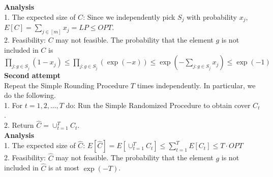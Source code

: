 \noindent\textbf{Analysis}\\
1. The expected size of $C$: Since we independently pick $S_j$ with probability $x_j$, $E[C]=\sum_{j \in [m]}x_j=LP\le OPT$.\\
2. Feasibility: $C$ may not feasible. The probability that the element $g$ is not included in $C$ is $\prod_{j:g\in S_j}(1-x_j)\le \prod_{j:g\in S_j}(\exp({-x})) \le \exp({-\sum_{j:g\in S_j}x_j}) \le \exp({-1})$\\
\noindent\textbf{Second attempt}\\
Repeat the Simple Rounding Procedure $T$ times independently. In particular, we do the following.\\
1. For $t=1,2,...,T$ do:
Run the Simple Randomized Procedure to obtain cover $C_t$.\\
2. Return $\widehat{C}=\cup_{t=1}^TC_t$.\\
\noindent\textbf{Analysis}\\
1. The expected size of $\widehat{C}$: $E[\widehat{C}]= E[\cup_{t=1}^TC_t]\le \sum_{t=1}^{T}E[C_t]\le T\cdot OPT$\\
2. Feasibility: $\widehat{C}$ may not feasible. The probability that the element $g$ is not included in $\widehat{C}$ is at most $\exp({-T})$.
